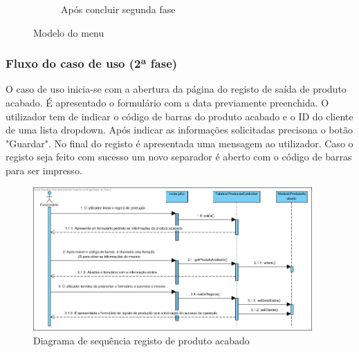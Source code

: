 \begin{figure}[H]
\begin{subfigure}[t]{0.45\linewidth}
		\label{fig:di_saida_prod_acabado_2}
		\caption{Após concluir segunda fase}
	\end{subfigure}
	
	\caption{Modelo do menu}
	\label{fig:di_saida_prod_acabado}
\end{figure}

\subsubsection*{Fluxo do caso de uso (2ª fase)}
O caso de uso inicia-se com a abertura da página do registo de saída de produto acabado. É apresentado o formulário com a data previamente preenchida. O utilizador tem de indicar o código de barras do produto acabado e o ID do cliente de uma lista dropdown.  Após indicar as informações solicitadas precisona o botão "Guardar". No final do registo é apresentada uma mensagem ao utilizador. Caso o registo seja feito com sucesso um novo separador é aberto com o código de barras para ser impresso.


\begin{figure}[H] 
	\begin{center}
		\includegraphics[width=0.95\textwidth,keepaspectratio]{figuras/Diagramas_vp/SD_Fabrica_5_Saida_de_Produto_Acabado.jpg}
		\caption{Diagrama de sequência registo de produto acabado}
		\label{fig:sd_saida_prod_acabado} 
	\end{center}
\end{figure}